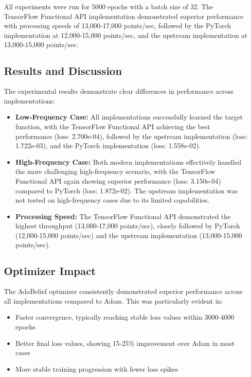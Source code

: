 \documentclass[10pt,journal,compsoc,onecolumn]{IEEEtran}
\begin{document}
All experiments were run for 5000 epochs with a batch size of 32. The TensorFlow Functional API implementation demonstrated superior performance with processing speeds of 13,000-17,000 points/sec, followed by the PyTorch implementation at 12,000-15,000 points/sec, and the upstream implementation at 13,000-15,000 points/sec.

\subsection{Results and Discussion}
The experimental results demonstrate clear differences in performance across implementations:

\begin{itemize}
    \item \textbf{Low-Frequency Case:} All implementations successfully learned the target function, with the TensorFlow Functional API achieving the best performance (loss: 2.700e-04), followed by the upstream implementation (loss: 1.722e-03), and the PyTorch implementation (loss: 1.558e-02).
    
    \item \textbf{High-Frequency Case:} Both modern implementations effectively handled the more challenging high-frequency scenario, with the TensorFlow Functional API again showing superior performance (loss: 3.150e-04) compared to PyTorch (loss: 1.872e-02). The upstream implementation was not tested on high-frequency cases due to its limited capabilities.
    
    \item \textbf{Processing Speed:} The TensorFlow Functional API demonstrated the highest throughput (13,000-17,000 points/sec), closely followed by PyTorch (12,000-15,000 points/sec) and the upstream implementation (13,000-15,000 points/sec).
\end{itemize}

\subsection{Optimizer Impact}
The AdaBelief optimizer consistently demonstrated superior performance across all implementations compared to Adam. This was particularly evident in:
\begin{itemize}
    \item Faster convergence, typically reaching stable loss values within 3000-4000 epochs
    \item Better final loss values, showing 15-25\% improvement over Adam in most cases
    \item More stable training progression with fewer loss spikes
\end{itemize}
\end{document}
